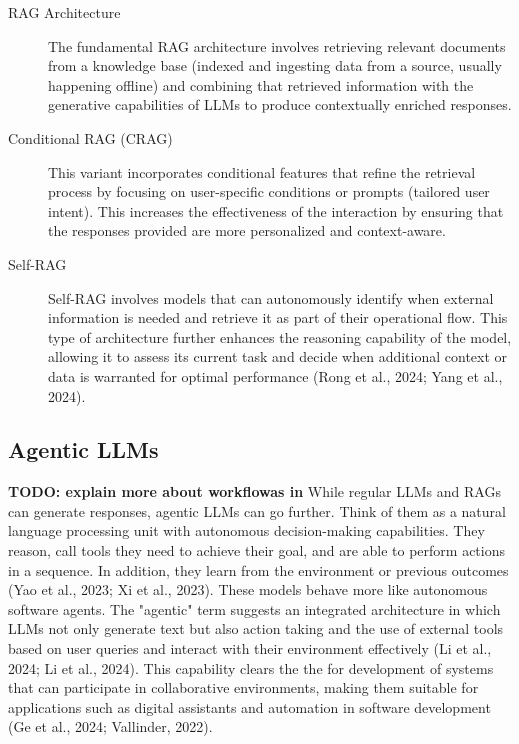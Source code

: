 \begin{description}
    \item[RAG Architecture] The fundamental RAG architecture involves retrieving relevant documents from a knowledge base (indexed and ingesting data from a source, usually happening offline) and combining that retrieved information with the generative capabilities of LLMs to produce contextually enriched responses.

    \item[Conditional RAG (CRAG)] This variant incorporates conditional features that refine the retrieval process by focusing on user-specific conditions or prompts (tailored user intent). This increases the effectiveness of the interaction by ensuring that the responses provided are more personalized and context-aware.

    \item[Self-RAG] Self-RAG involves models that can autonomously identify when external information is needed and retrieve it as part of their operational flow. This type of architecture further enhances the reasoning capability of the model, allowing it to assess its current task and decide when additional context or data is warranted for optimal performance (Rong et al., 2024; Yang et al., 2024).
\end{description}


\subsection{Agentic LLMs} 
\label{subsec:background:first_section:third_subsection}
\textbf{TODO: explain more about workflowas in }
\newline\newline
While regular LLMs and RAGs can generate responses, agentic LLMs can go further. Think of them as a natural language processing unit with autonomous decision-making capabilities. They reason, call tools they need to achieve their goal, and are able to perform actions in a sequence. In addition, they learn from the environment or previous outcomes (Yao et al., 2023; Xi et al., 2023). These models behave more like autonomous software agents. The "agentic" term suggests an integrated architecture in which LLMs not only generate text but also action taking and the use of external tools based on user queries and interact with their environment effectively (Li et al., 2024; Li et al., 2024). This capability clears the the for development of systems that can participate in collaborative environments, making them suitable for applications such as digital assistants and automation in software development (Ge et al., 2024; Vallinder, 2022).

